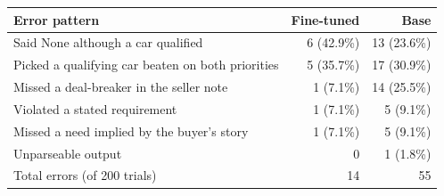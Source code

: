 \begin{tabular}{lrr}
\toprule
Error pattern & Fine-tuned & Base \\
\midrule
Said None although a car qualified & 6 (42.9\%) & 13 (23.6\%) \\
Picked a qualifying car beaten on both priorities & 5 (35.7\%) & 17 (30.9\%) \\
Missed a deal-breaker in the seller note & 1 (7.1\%) & 14 (25.5\%) \\
Violated a stated requirement & 1 (7.1\%) & 5 (9.1\%) \\
Missed a need implied by the buyer's story & 1 (7.1\%) & 5 (9.1\%) \\
Unparseable output & 0 & 1 (1.8\%) \\
\midrule
Total errors (of 200 trials) & 14 & 55 \\
\bottomrule
\end{tabular}
